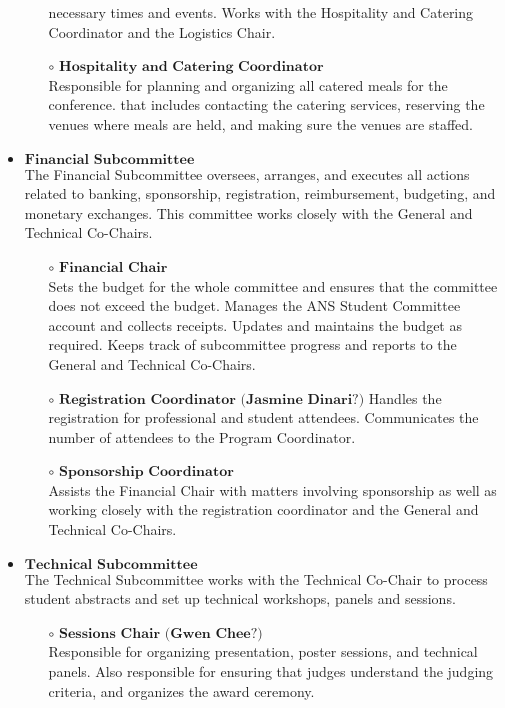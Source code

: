 \begin{itemize}
\begin{itemize}
		necessary times and events. Works with the Hospitality and Catering Coordinator and the Logistics Chair.
		\item[$\circ$] $\textbf{Hospitality and Catering Coordinator}$\\
		Responsible for planning and organizing all catered meals for the conference. that includes contacting the catering services, reserving the venues where meals are held, and making sure the venues are staffed.
	\end{itemize}
	\item $\textbf{Financial Subcommittee}$\\
	The Financial Subcommittee oversees, arranges, and executes all actions related to banking, sponsorship, registration, reimbursement, budgeting, and monetary exchanges. This committee works closely with the General and Technical Co-Chairs.
	\begin{itemize}
		\item[$\circ$] $\textbf{Financial Chair}$\\
		Sets the budget for the whole committee and ensures that the committee does not exceed the budget. Manages the ANS Student Committee account and collects receipts. Updates and maintains the budget as required. Keeps track of subcommittee progress and reports to the General and Technical Co-Chairs. 
		\item[$\circ$] $\textbf{Registration Coordinator (Jasmine Dinari?)}$
		Handles the registration for professional and student attendees. Communicates the number of attendees to the Program Coordinator. 
		\item[$\circ$] $\textbf{Sponsorship Coordinator}$\\
		Assists the Financial Chair with matters involving sponsorship as well as working closely with the registration coordinator and the General and Technical Co-Chairs.
	\end{itemize}
	\item $\textbf{Technical Subcommittee}$\\
	The Technical Subcommittee works with the Technical Co-Chair to process student abstracts and set up 
	technical workshops, panels and sessions. 
	\begin{itemize}
		\item[$\circ$] $\textbf{Sessions Chair (Gwen Chee?)}$\\
		Responsible for organizing presentation, poster sessions, and technical
		panels. Also responsible for ensuring that judges understand the judging criteria, and organizes the award ceremony.

\end{itemize}
\end{itemize}
